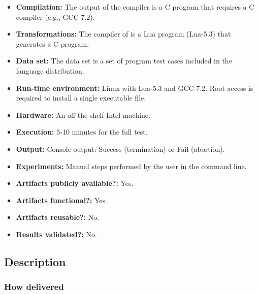 {\small
\begin{itemize}
  \item {\bf Compilation: } The output of the \CEU compiler is a C program that requires a C compiler (e.g., GCC-7.2).
  \item {\bf Transformations: } The compiler of \CEU is a Lua program (Lua-5.3) that generates a C program.
  \item {\bf Data set: } The data set is a set of program test cases included in the language distribution.
  \item {\bf Run-time environment: } Linux with Lua-5.3 and GCC-7.2. Root access is required to install a single executable file.
  \item {\bf Hardware: } An off-the-shelf Intel machine.
  \item {\bf Execution: } 5-10 minutes for the full test.
  \item {\bf Output: } Console output: Success (termination) or Fail (abortion).
  \item {\bf Experiments: } Manual steps performed by the user in the command line.
\end{itemize}

\begin{itemize}
  \item {\bf Artifacts publicly available?:} Yes.
  \item {\bf Artifacts functional?:} Yes.
  \item {\bf Artifacts reusable?:} No.
  \item {\bf Results validated?:} No.
\end{itemize}

\subsection{Description}

\subsubsection{How delivered}

}
